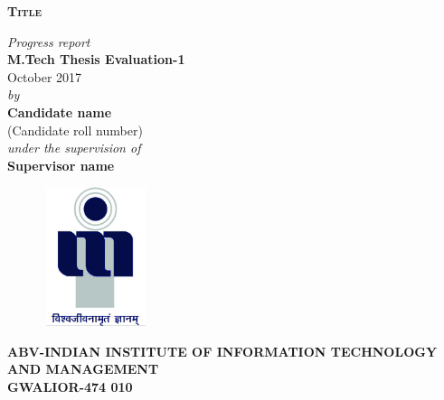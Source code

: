 \documentclass[12pt,a4paper]{article}
\begin{document}
\thispagestyle{empty}
\begin{titlepage}
\begin{center}
\textsc{\Large \textbf{Title}}\\[1.2cm]
\end{center}
\begin{center}
\vspace{0.1in}
{\Large \it Progress report} \\
\vspace{0.3in}
{\Large \bf M.Tech Thesis Evaluation-1} \\
October 2017\\
\vspace{0.3in}
{\large \it by\\}
\vspace{0.2in}
{\Large \bf Candidate name}\\
\vspace{0.2in}
{\Large (Candidate roll number)}\\
\vspace{0.4in}
{\large \it under the supervision of\\}
\vspace{0.3in}
{\Large \bf Supervisor name}\\
\end {center}
\vspace{0.2in}
\begin{figure}[h]
\centerline{\includegraphics[width=1.2in,height=1.6in]{iiitm}}
\end{figure}
\vspace{0.1in}
\begin{center}
{\Large \bf ABV-INDIAN INSTITUTE OF INFORMATION TECHNOLOGY AND MANAGEMENT\\
GWALIOR-474 010\\}
\end{center}
\end{titlepage}
\end{document}
